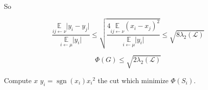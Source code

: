 \documentclass[12pt]{article}
\newcommand{\EE}{\mathbb{E}}
\renewcommand{\L}{\mathcal{L}}
\newcommand{\la}{\leftarrow}
\DeclareMathOperator{\sgn}{sgn}
\begin{document}
So

\[
    \frac{\underset{ij\la\nu}{\EE}\lvert y_i-y_j \rvert}{\underset{i\la\mu}{\EE}\lvert y_i \rvert} \leqslant \sqrt{\frac{4 \underset{ij\la\nu}{\EE}(x_i-x_j)^2}{\underset{i\la\mu}{\EE}\lvert y_i \rvert}} \leqslant\sqrt{8\lambda_2(\L)}
\]

\[
    \Phi(G) \leqslant \sqrt{2\lambda_2(\L)}
\]

\begin{algorithm}[!ht]
    \DontPrintSemicolon
    Compute $x$\;
    $y_i = \sgn(x_i){x_i}^2$\;
    \Return the cut which minimize $\Phi(S_i)$.
\end{algorithm}



\end{document}
